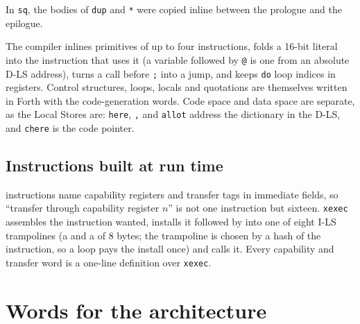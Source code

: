 In \texttt{sq}, the bodies of \texttt{dup} and \texttt{*} were copied inline between the prologue and the
epilogue.

The compiler inlines primitives of up to four instructions, folds a 16-bit literal into the
instruction that uses it (a variable followed by \texttt{@} is one  from an absolute D-LS
address), turns a call before \texttt{;} into a jump, and keeps \texttt{do} loop indices in registers.
Control structures, loops, locals and quotations are themselves written in Forth with the
code-generation words. Code space and data space are separate, as the Local Stores are: \texttt{here},
\texttt{,} and \texttt{allot} address the dictionary in the D-LS, and \texttt{chere} is the code pointer.

\subsection{Instructions built at run time}
\IS instructions name capability registers and transfer tags in immediate fields, so ``transfer
through capability register $n$'' is not one instruction but sixteen. \texttt{xexec} assembles the
instruction wanted, installs it followed by  into one of eight I-LS trampolines (a
 and a  of 8 bytes; the trampoline is chosen by a hash of the instruction, so a
loop pays the install once) and calls it. Every capability and transfer word is a one-line definition
over \texttt{xexec}.

\section{Words for the architecture}

